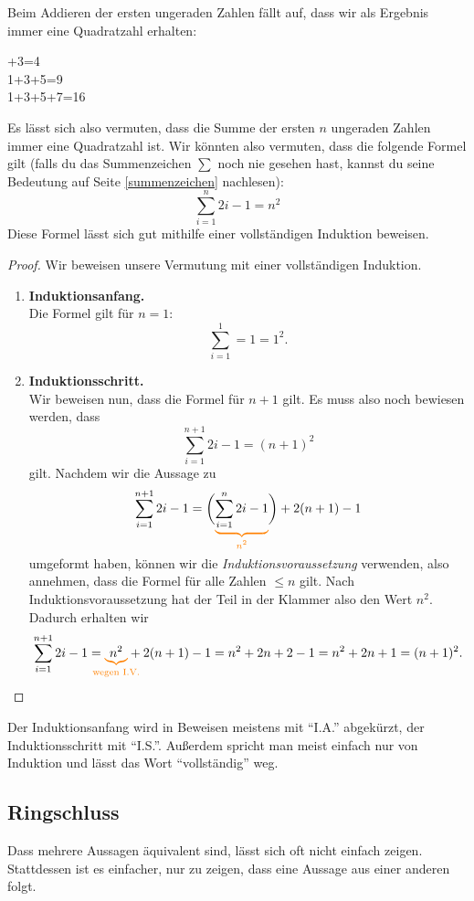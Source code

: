 \documentclass[../../main.tex]{subfiles}
\begin{document}
    \begin{example}{}
        Beim Addieren der ersten ungeraden Zahlen fällt auf, dass wir als Ergebnis immer eine Quadratzahl erhalten:
        \begin{multicols}{3}+3=4\\
            1+3+5=9\\
            1+3+5+7=16
        \end{multicols}
        Es lässt sich also vermuten, dass die Summe der ersten $n$ ungeraden Zahlen immer eine Quadratzahl ist. Wir könnten also vermuten, dass die folgende Formel gilt (falls du das Summenzeichen $\sum$ noch nie gesehen hast, kannst du seine Bedeutung auf Seite \ref{summenzeichen} nachlesen):
        \[\sum_{i=1}^n2i-1=n^2\]
        Diese Formel lässt sich gut mithilfe einer vollständigen Induktion beweisen.
        \begin{proof}
        Wir beweisen unsere Vermutung mit einer vollständigen Induktion.
        \begin{enumerate}
            \item \textbf{Induktionsanfang.}\\
                Die Formel gilt für $n=1$:
                \[\sum_{i=1}^1=1=1^2.\]
            \item \textbf{Induktionsschritt.}\\
                Wir beweisen nun, dass die Formel für $n+1$ gilt. Es muss also noch bewiesen werden, dass
                \[\sum_{i=1}^{n+1}2i-1=(n+1)^2\]
                gilt. Nachdem wir die Aussage zu
                \[\sum_{i=1}^{n+1}2i-1=\biggl(\colorbrace{\sum_{i=1}^n2i-1}{n^2}\biggr)+2(n+1)-1\]
                umgeformt haben, können wir die \emph{Induktionsvoraussetzung} verwenden, also annehmen, dass die Formel für alle Zahlen $\leq n$ gilt. Nach Induktionsvoraussetzung hat der Teil in der Klammer also den Wert $n^2$. Dadurch erhalten wir
                \[\sum_{i=1}^{n+1}2i-1=\colorbrace{n^2}{\text{wegen~I.V.}}+2(n+1)-1=n^2+2n+2-1=n^2+2n+1=(n+1)^2.\]
        \end{enumerate}
        \end{proof}
    \end{example}
    Der Induktionsanfang wird in Beweisen meistens mit \enquote{I.A.} abgekürzt, der Induktionsschritt mit \enquote{I.S.}. Außerdem spricht man meist einfach nur von Induktion und lässt das Wort \enquote{vollständig} weg.
    
    \subsection*{Ringschluss}
    Dass mehrere Aussagen äquivalent sind, lässt sich oft nicht einfach zeigen. Stattdessen ist es einfacher, nur zu zeigen, dass eine Aussage aus einer anderen folgt.
\end{document}
